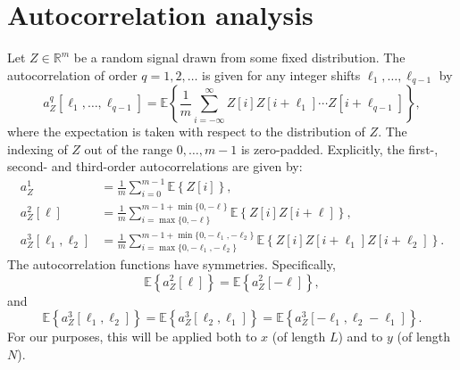 \documentclass[12pt]{article}
\newcommand{\E}{\mathbb{E}}
\newcommand{\1}{\mathbf{1}}
\newcommand{\TODO}[1]{{\color{red}{[#1]}}}
\newcommand{\R}{\mathbb{R}}
\theoremstyle{plain}
\theoremstyle{definition}
\theoremstyle{remark}
\theoremstyle{plain}
\theoremstyle{remark}
\theoremstyle{plain}
\theoremstyle{plain}
\theoremstyle{plain}
\numberwithin{equation}{section}
\begin{document}
\section{Autocorrelation analysis} \label{sec:AC_analysis}

%


Let $Z\in \R^m$ be a random signal drawn from some fixed distribution.  The autocorrelation of order $q = 1, 2, \ldots$ is given for any integer shifts $\ell_1, \ldots, \ell_{q-1}$ by
\begin{equation}
a_Z^q[\ell_1,\ldots,\ell_{q-1}]   = \E\left\{\frac{1}{m} \sum_{i=-\infty}^{\infty} Z[i]Z[i+\ell_1]\cdots Z[i+\ell_{q-1}]\right\},
\label{eq:ac_general}
\end{equation}
where the expectation is taken with respect to the distribution of $Z$. The indexing of $Z$ out of the range $0, \ldots, m-1$ is zero-padded.
Explicitly, the first-, second- and third-order autocorrelations are given by: 
\begin{align} 
a_Z^1 & = \frac{1}{m} \sum_{i=0}^{m-1} \E\left\{
Z[i]\right\}, \nonumber\\
a_Z^2[\ell] & = \frac{1}{m} \sum_{i = \max\{0, -\ell\}}^{m-1 + \min\{0, -\ell\}} \E\left\{Z[i]Z[i+\ell]\right\},\\
a_Z^3[\ell_1,\ell_2] & = \frac{1}{m} \sum_{i = \max\{0, -\ell_1, -\ell_2\}}^{m-1 + \min\{0, -\ell_1, -\ell_2\}} \E\left\{Z[i]Z[i+\ell_1]Z[i+\ell_2]\right\}.  \nonumber \label{eq:ac_special}
\end{align}
The autocorrelation functions have symmetries. Specifically, $$\E\left\{a_Z^2[\ell]\right\} = \E\left\{a_Z^2[-\ell]\right\},$$ and \TODO{to verify}
$$\E\left\{a_Z^3[\ell_1,\ell_2]\right\} = \E\left\{a_Z^3[\ell_2,\ell_1]\right\}=\E\left\{a_Z^3[-\ell_1,\ell_2-\ell_1]\right\}.
$$
For our purposes, this will be applied both to $x$ (of length $L$) and to $y$ (of length $N$).
\end{document}
